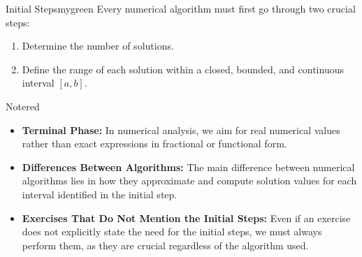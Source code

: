 \begin{prettyBox}{Initial Steps}{mygreen}
Every numerical algorithm must first go through two crucial steps:  
\begin{enumerate}
    \item Determine the number of solutions.  
    \item Define the range of each solution within a closed, bounded, and continuous interval \([a, b]\).  
\end{enumerate}
\end{prettyBox}

\newpage

\begin{prettyBox}{Note}{red}
\begin{itemize}
    \item \textbf{Terminal Phase:} In numerical analysis, we aim for real
numerical values rather than exact expressions in fractional or functional form.  
    \item \textbf{Differences Between Algorithms:} The main difference between 
numerical algorithms lies in how they approximate and compute solution values
for each interval identified in the initial step.  
    \item \textbf{Exercises That Do Not Mention the Initial Steps:} Even if
an exercise does not explicitly state the need for the initial steps, we must
always perform them, as they are crucial regardless of the algorithm used.

\end{itemize}
\end{prettyBox}

\vspace{0.5cm}

